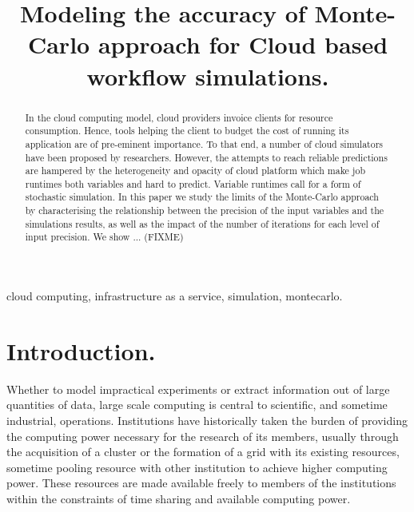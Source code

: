 \documentclass[10pt,conference,compsocconf]{IEEEtran}
\title{Modeling the accuracy of Monte-Carlo approach for Cloud based workflow simulations.}
\author{\IEEEauthorblockN{Luke~Bertot 
			and Stéphane~Genaud 
			and Julien~Gossa}
	\IEEEauthorblockA{Icube-ICPS --- UMR 7357, Univeristé de Strasbourg, CNRS\\
		P\^ole API Blvd S. Bant, 67400 Illkirch\\
		email: \url{lbertot@unistra.fr}, \url{gossa@unistra.fr}, \url{genaud@unistra.fr}}
	}
\begin{document}
\maketitle

\begin{abstract}
  In the  cloud computing  model, cloud providers  invoice clients  for resource
  consumption. Hence, tools helping the client to budget the cost of running its
  application are  of pre-eminent  importance. To  that end,  a number  of cloud
  simulators have been  proposed by researchers. However, the  attempts to reach
  reliable predictions  are hampered by  the heterogeneity and opacity  of cloud
  platform which make job runtimes both  variables and hard to predict. Variable
  runtimes call for a form of stochastic simulation.
In this paper we study  the limits of the Monte-Carlo approach by
  characterising the relationship  between the precision of  the input variables
  and the simulations results, as well as the impact of the number of iterations
  for each level of input precision. We show ... (FIXME)
\end{abstract}

\begin{IEEEkeywords}
cloud computing, infrastructure as a service, simulation, montecarlo.
\end{IEEEkeywords}

\section{Introduction.}

Whether to  model impractical  experiments or extract  information out  of large
quantities of data, large scale computing is central to scientific, and sometime
industrial,  operations.  Institutions  have  historically taken  the burden  of
providing the computing power necessary for the research of its members, usually
through  the acquisition  of a  cluster  or the  formation  of a  grid with  its
existing resources, sometime pooling resource  with other institution to achieve
higher computing power.  These resources are made available freely to members of
the institutions within the constraints  of time sharing and available computing
power.
\end{document}
